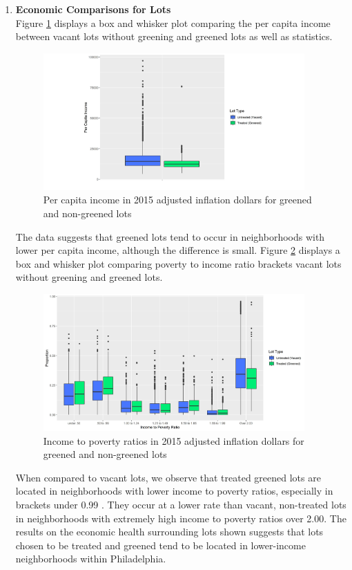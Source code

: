 \documentclass{article}
\begin{document}
\begin{enumerate}
    \item \textbf{Economic Comparisons for Lots} \\
    Figure \ref{fig:figure5} displays a box and whisker plot comparing the per capita income between vacant lots without greening and greened lots as well as statistics.
    \begin{figure}[h]
    \includegraphics[width=10cm]{imgs/chart_pci.jpg}
    \centering
    \caption{Per capita income in 2015 adjusted inflation dollars for greened and non-greened lots}
    \label{fig:figure5}
    \end{figure}
    The data suggests that greened lots tend to occur in neighborhoods with lower per capita income, although the difference is small.    
    Figure \ref{fig:figure6} displays a box and whisker plot comparing poverty to income ratio brackets vacant lots without greening and greened lots.
    \begin{figure}[h]
    \includegraphics[width=10cm]{imgs/chart_inc_pov.jpg}
    \centering
    \caption{Income to poverty ratios in 2015 adjusted inflation dollars for greened and non-greened lots}
    \label{fig:figure6}
    \end{figure}
    When compared to vacant lots, we observe that treated greened lots are located in neighborhoods with lower income to poverty ratios, especially in brackets under 0.99 . They occur at a lower rate than vacant, non-treated lots in neighborhoods with extremely high income to poverty ratios over 2.00. The results on the economic health surrounding lots shown suggests that lots chosen to be treated and greened tend to be located in lower-income neighborhoods within Philadelphia. 

\end{enumerate}
\end{document}
